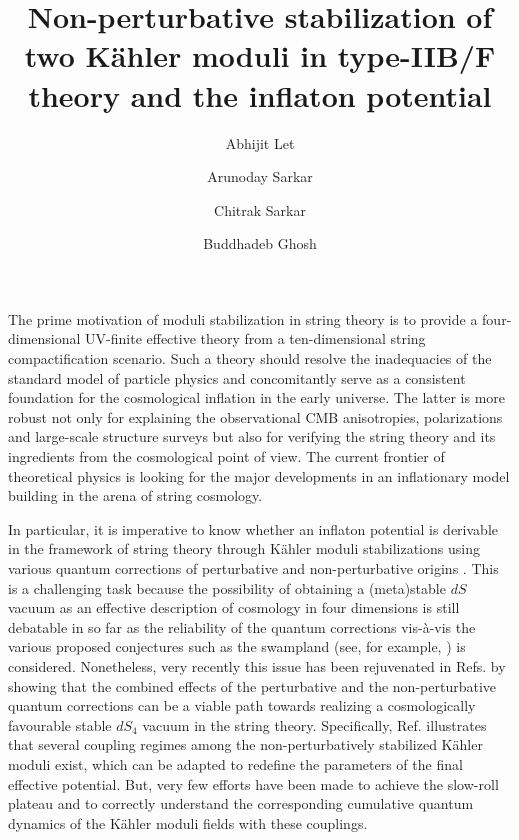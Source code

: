\documentclass[doublecol]{epl2}
\title{\boldmath Non-perturbative stabilization of two K\"ahler moduli in type-IIB/F theory and the inflaton potential}
\author{Abhijit Let\inst{} \and Arunoday Sarkar\inst{} \and Chitrak Sarkar\inst{} \and Buddhadeb Ghosh \inst{}}
\institute{                    
  \inst{} Centre of Advanced Studies, Department of Physics, The University of Burdwan,\\Burdwan 713 104, India
  
}
\begin{document}
\maketitle
\flushbottom
The prime motivation of moduli stabilization in string theory \cite{Becker:2006dvp} is to provide a four-dimensional UV-finite effective theory from a ten-dimensional string compactification scenario. Such a theory should resolve the inadequacies of the standard model of particle physics and concomitantly serve as a consistent foundation for the cosmological inflation in the early universe. The latter is more robust not only for explaining the observational CMB anisotropies, polarizations and large-scale structure surveys but also for verifying the string theory and its ingredients from the cosmological point of view. The current frontier of theoretical physics is looking for the major developments in an inflationary model building in the arena of string cosmology.\par  In particular, it is imperative to know whether an inflaton potential is derivable in the framework of string theory through K\"{a}hler moduli stabilizations using various quantum corrections of perturbative and non-perturbative origins \cite{Antoniadis:2018ngr,Antoniadis:2020stf,Conlon:2005jm,Let:2022fmu}. This is a challenging task because the possibility of obtaining a (meta)stable $dS$ vacuum as an effective description of cosmology in four dimensions is still debatable in so far as the reliability of the quantum corrections vis-\`a-vis the various proposed conjectures such as the swampland (see, for example, \cite{Agrawal:2018own,Palti:2019pca,Junghans:2018gdb,Akrami:2018ylq,Denef:2018etk,Conlon:2018eyr}) is considered. Nonetheless, very recently this issue has been rejuvenated in Refs.\cite{Basiouris:2020jgp,Basiouris:2021sdf,Let:2022fmu} by showing that the combined effects of the perturbative \cite{Antoniadis:2019doc,Antoniadis:2018ngr,Antoniadis:2018hqy,Antoniadis:2020stf,Antoniadis:2019rkh} and the non-perturbative \cite{Kachru:2003aw,Haack:2006cy,Bianchi:2011qh,Bena:2019mte} quantum corrections can be a viable path towards realizing a cosmologically favourable stable $dS_4$ vacuum in the string theory. Specifically, Ref. \cite{Basiouris:2021sdf} illustrates that several coupling regimes among the non-perturbatively stabilized K\"{a}hler moduli exist, which can be adapted to redefine the parameters of the final effective potential. But, very few efforts have been made to achieve the slow-roll plateau and to correctly understand the corresponding cumulative quantum dynamics of the K\"{a}hler moduli fields with these couplings.\par 
\end{document}

